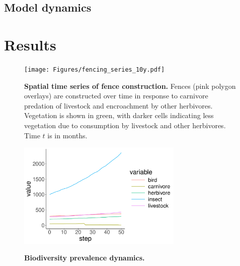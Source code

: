 \documentclass{article}
\theoremstyle{mytheorem}
\theoremstyle{myremark}
\begin{document}
\subsection{Model dynamics}


\section{Results}

\begin{figure}
  \caption{\textbf{Spatial time series of fence construction.} Fences (pink
  polygon overlays) are constructed over time in response to carnivore
  predation of livestock and encroachment by other herbivores. Vegetation is
  shown in green, with darker cells indicating less vegetation due to consumption
  by livestock and other herbivores. Time $t$ is in months.}
  \centering
  \texttt{[image: Figures/fencing\_series\_10y.pdf]}
  \label{fig:fence_series}
\end{figure}


\begin{figure}
  \caption{\textbf{Biodiversity prevalence dynamics.}}
  \centering
    \includegraphics[width=0.7\textwidth]{Figures/prevalence_dynamics.pdf}
  \label{fig:prevalence_dynamics}
\end{figure}


\printbibliography
\end{document}
